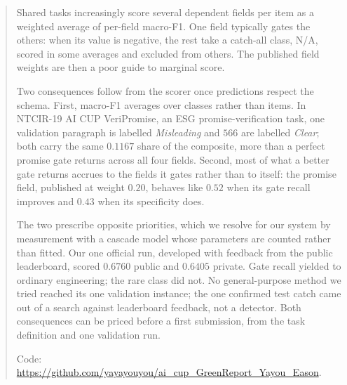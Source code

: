 \documentclass[sigconf,article]{acmart}
\begin{document}
\begin{abstract}
Shared tasks increasingly score several dependent fields per item as a weighted average of
per-field macro-F1. One field typically gates the others: when its value is negative, the rest
take a catch-all class, N/A, scored in some averages and excluded from others. The
published field weights are then a poor guide to marginal score.

Two consequences follow from the scorer once predictions respect the schema. First, macro-F1 averages over classes rather than
items. In NTCIR-19 AI CUP VeriPromise, an ESG promise-verification task, one validation paragraph
is labelled \emph{Misleading} and $566$ are labelled \emph{Clear}; both carry the same $0.1167$
share of the composite, more than a perfect promise gate returns across all four fields. Second,
most of what a better gate returns accrues to the fields it gates rather than to itself: the
promise field, published at weight $0.20$, behaves like $0.52$ when its gate recall improves
and $0.43$ when its specificity does.

The two prescribe opposite priorities, which we resolve for our system by measurement with a cascade model whose
parameters are counted rather than fitted. Our one official run, developed with feedback from the
public leaderboard, scored $0.6760$ public and $0.6405$ private. Gate recall yielded to ordinary engineering; the rare class did not. No
general-purpose method we tried reached its one validation instance; the one confirmed test
catch came out of a search against leaderboard feedback, not a detector. Both consequences can be priced before a
first submission, from the task definition and one validation run.

Code: \url{https://github.com/yayayouyou/ai_cup_GreenReport_Yayou_Eason}.
\end{abstract}
\end{document}

